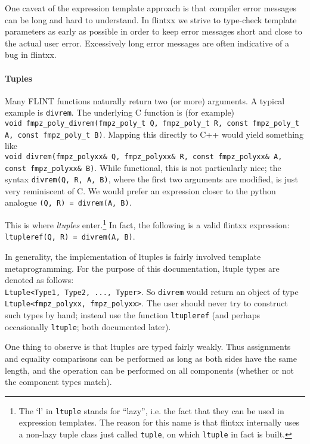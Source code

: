\documentclass[a4paper,10pt]{book}
\newcommand{\code}{\lstinline}
\begin{document}
{{One caveat of the expression template approach is that compiler error messages
can be long and hard to understand.
In flintxx we strive to type-check template parameters as early as possible in
order to keep error messages short and close to the actual user error.
Excessively long error messages are often indicative of a bug in flintxx.

\paragraph{Tuples}

Many FLINT functions naturally return two (or more) arguments. A typical example
is \code{divrem}. The underlying C function is (for example)\\
\code{void fmpz_poly_divrem(fmpz_poly_t Q, fmpz_poly_t R, const fmpz_poly_t A, const fmpz_poly_t B)}.
Mapping this directly to C++ would yield something like\\
\code{void divrem(fmpz_polyxx& Q, fmpz_polyxx& R, const fmpz_polyxx& A, const fmpz_polyxx& B)}.
While functional, this is not particularly nice; the syntax
\code{divrem(Q, R, A, B)}, where the first two arguments are modified, is just
very reminiscent of C. We would prefer an expression closer to the
python analogue \code{(Q, R) = divrem(A, B)}.

This is where \emph{ltuples} enter.\footnote{The `l' in \code{ltuple} stands for
``lazy'', i.e. the fact that they can be used in expression templates.
The reason for this name
is that flintxx internally uses a non-lazy tuple class just
called \code{tuple}, on which \code{ltuple} in fact is built.}
In fact, the following is a valid
flintxx expression:\\
\code{ltupleref(Q, R) = divrem(A, B)}.

In generality, the implementation of ltuples is fairly involved template
metaprogramming. For the purpose of this documentation, ltuple types are denoted
as follows:\\
\code{Ltuple<Type1, Type2, ..., Typer>}. So \code{divrem} would
return an object of type\\
\code{Ltuple<fmpz_polyxx, fmpz_polyxx>}. The user
should never try to construct such types by hand; instead use the function
\code{ltupleref} (and perhaps occasionally \code{ltuple}; both documented
later).

One thing to observe is that ltuples are typed fairly weakly. Thus assignments
and equality comparisons can be performed as long as both sides have the same
length, and the operation can be performed on all components (whether or not the
component types match).

}}
\end{document}
